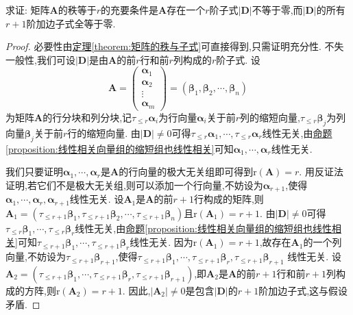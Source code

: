 \documentclass[lang=cn,newtx,10pt,scheme=chinese]{elegantbook}
\begin{document}
\begin{proposition}\label{proposition:矩阵的秩与子式及其加边子式的关系}
求证: 矩阵\(\boldsymbol{A}\)的秩等于\(r\)的充要条件是\(\boldsymbol{A}\)存在一个\(r\)阶子式\(|\boldsymbol{D}|\)不等于零,而\(|\boldsymbol{D}|\)的所有\(r + 1\)阶加边子式全等于零.
\end{proposition}
\begin{proof}
必要性由\hyperref[theorem:矩阵的秩与子式]{定理\ref{theorem:矩阵的秩与子式}}可直接得到,只需证明充分性. 不失一般性,我们可设\(|\boldsymbol{D}|\)是由\(\boldsymbol{A}\)的前\(r\)行和前\(r\)列构成的\(r\)阶子式. 设
\[
\boldsymbol{A}=\begin{pmatrix}
\boldsymbol{\alpha}_1\\
\boldsymbol{\alpha}_2\\
\vdots\\
\boldsymbol{\alpha}_m
\end{pmatrix}=(\boldsymbol{\beta}_1,\boldsymbol{\beta}_2,\cdots,\boldsymbol{\beta}_n)
\]
为矩阵\(\boldsymbol{A}\)的行分块和列分块,记\(\tau_{\leq r}\boldsymbol{\alpha}_i\)为行向量\(\boldsymbol{\alpha}_i\)关于前\(r\)列的缩短向量,\(\tau_{\leq r}\boldsymbol{\beta}_j\)为列向量\(\boldsymbol{\beta}_j\)关于前\(r\)行的缩短向量. 由\(|\boldsymbol{D}|\neq0\)可得\(\tau_{\leq r}\boldsymbol{\alpha}_1,\cdots,\tau_{\leq r}\boldsymbol{\alpha}_r\)线性无关,由\hyperref[proposition:线性相关向量组的缩短组也线性相关]{命题\ref{proposition:线性相关向量组的缩短组也线性相关}}可知\(\boldsymbol{\alpha}_1,\cdots,\boldsymbol{\alpha}_r\)线性无关. 

我们只要证明\(\boldsymbol{\alpha}_1,\cdots,\boldsymbol{\alpha}_r\)是\(\boldsymbol{A}\)的行向量的极大无关组即可得到\(\mathrm{r}(\boldsymbol{A}) = r\). 用反证法证明,若它们不是极大无关组,则可以添加一个行向量,不妨设为\(\boldsymbol{\alpha}_{r + 1}\),使得\(\boldsymbol{\alpha}_1,\cdots,\boldsymbol{\alpha}_r,\boldsymbol{\alpha}_{r + 1}\)线性无关. 设\(\boldsymbol{A}_1\)是\(\boldsymbol{A}\)的前\(r + 1\)行构成的矩阵,则\(\boldsymbol{A}_1 = (\tau_{\leq r + 1}\boldsymbol{\beta}_1,\tau_{\leq r + 1}\boldsymbol{\beta}_2,\cdots,\tau_{\leq r + 1}\boldsymbol{\beta}_n)\)且\(\mathrm{r}(\boldsymbol{A}_1)=r + 1\). 由\(|\boldsymbol{D}|\neq0\)可得\(\tau_{\leq r}\boldsymbol{\beta}_1,\cdots,\tau_{\leq r}\boldsymbol{\beta}_r\)线性无关,由\hyperref[proposition:线性相关向量组的缩短组也线性相关]{命题\ref{proposition:线性相关向量组的缩短组也线性相关}}可知\(\tau_{\leq r + 1}\boldsymbol{\beta}_1,\cdots,\tau_{\leq r + 1}\boldsymbol{\beta}_r\)线性无关. 因为\(\mathrm{r}(\boldsymbol{A}_1)=r + 1\),故存在\(\boldsymbol{A}_1\)的一个列向量,不妨设为\(\tau_{\leq r + 1}\boldsymbol{\beta}_{r + 1}\),使得\(\tau_{\leq r + 1}\boldsymbol{\beta}_1,\cdots,\tau_{\leq r + 1}\boldsymbol{\beta}_r,\tau_{\leq r + 1}\boldsymbol{\beta}_{r + 1}\)
线性无关. 设\(\boldsymbol{A}_2 = (\tau_{\leq r + 1}\boldsymbol{\beta}_1,\cdots,\tau_{\leq r + 1}\boldsymbol{\beta}_r,\tau_{\leq r + 1}\boldsymbol{\beta}_{r + 1})\),即\(\boldsymbol{A}_2\)是\(\boldsymbol{A}\)的前\(r + 1\)行和前\(r + 1\)列构成的方阵,则\(\mathrm{r}(\boldsymbol{A}_2)=r + 1\). 因此,\(|\boldsymbol{A}_2|\neq0\)是包含\(|\boldsymbol{D}|\)的\(r + 1\)阶加边子式,这与假设矛盾.
\end{proof}
\end{document}
